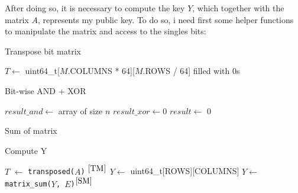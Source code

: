 After doing so, it is necessary to compute the key \(Y\), which together with the matrix \(A\), represents my public key. To do so, i need first some helper functions to manipulate the matrix and access to the singles bits:

\begin{algorithm}[H]
\DontPrintSemicolon
\caption{Transpose bit matrix \label{TM}}
$T \leftarrow$ uint64\_t[$M$.COLUMNS * 64][$M$.ROWS / 64] filled with 0s\;
\;
\end{algorithm}

\begin{algorithm}[H]
\DontPrintSemicolon
\caption{Bit-wise AND + XOR \label{BAX}}
$result\_and \leftarrow$ array of size $n$\;
$result\_xor \leftarrow 0$\;
$result \leftarrow$ 0\;
\;
\end{algorithm}

\begin{algorithm}[H]
\DontPrintSemicolon
\caption{Sum of matrix \label{SM}}
\end{algorithm}

\begin{algorithm}[H]
\DontPrintSemicolon
\caption{Compute Y \label{CY}} 
$T$ $\leftarrow$ \texttt{transposed($A$)} $^{\ref{TM}}$\;
$Y \leftarrow$ uint64\_t[ROWS][COLUMNS]\;
$Y \leftarrow$ \texttt{matrix\_sum($Y$, $E$)$^{\ref{SM}}$}\;
\end{algorithm}

